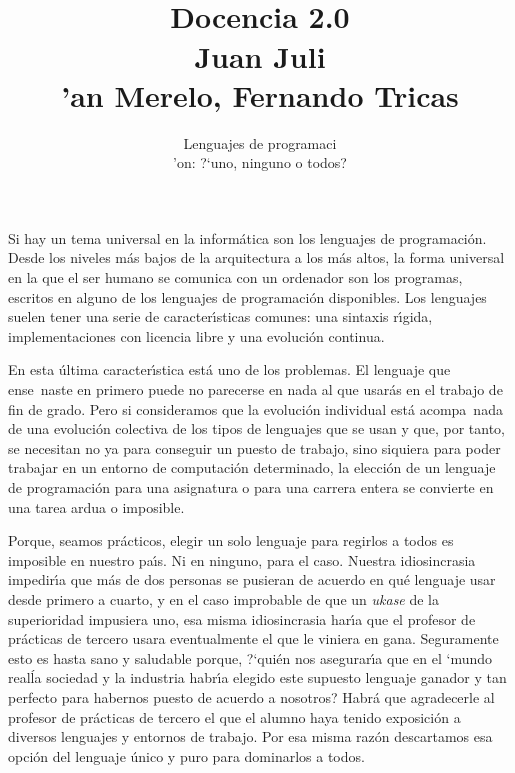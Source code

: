 \documentclass[twoside,10pt]{article}
\title{\ \\ Docencia 2.0\\ \large Juan Juli\\'{a}n Merelo, Fernando Tricas}
\author{\LARGE Lenguajes de programaci\\'on: ?`uno, ninguno o todos?}
\date{}
\newcounter{vol}
\begin{document}
\addtocounter{page}{2}

\maketitle

\vspace*{-5ex}

\begin{multicols}{2}

Si hay un tema universal en la inform\'atica son los lenguajes de
programaci\'on. Desde los niveles m\'as bajos de la arquitectura a los m\'as
altos, la forma universal en la que el ser humano se comunica con un
ordenador son los programas, escritos en alguno de los lenguajes de
programaci\'on disponibles. Los lenguajes suelen tener una serie de
caracter\'{\i}sticas comunes: una sintaxis r\'{\i}gida, implementaciones con
licencia libre y una evoluci\'on continua.

En esta \'ultima caracter\'{\i}stica est\'a uno de los problemas. El lenguaje
que ense~naste en primero puede no parecerse en nada al que usar\'as en
el trabajo de fin de grado. Pero si consideramos que la evoluci\'on
individual est\'a acompa~nada de una evoluci\'on colectiva de los tipos de
lenguajes que se usan y que, por tanto, se necesitan no ya para
conseguir un puesto de trabajo, sino siquiera para poder trabajar en
un entorno de computaci\'on determinado, la elecci\'on de un lenguaje de
programaci\'on para una asignatura o para una carrera entera se convierte en
una tarea ardua o imposible.

Porque, seamos pr\'acticos, elegir un solo lenguaje para regirlos a
todos es imposible en nuestro pa\'{\i}s. Ni en ninguno, para el caso.
Nuestra idiosincrasia impedir\'{\i}a que m\'as de dos personas se pusieran de
acuerdo en qu\'e lenguaje usar desde primero a cuarto, y en el caso
improbable de que un {\em ukase} de la superioridad impusiera uno, esa
misma idiosincrasia har\'{\i}a que el profesor de pr\'acticas de tercero usara
eventualmente el que le viniera en gana. 
Seguramente esto es hasta sano y saludable porque, ?`qui\'en nos asegurar\'{\i}a
que en el `mundo real\' la sociedad y la industria habr\'{\i}a elegido este
supuesto lenguaje ganador y tan perfecto para habernos puesto de acuerdo a
nosotros? Habr\'a que agradecerle al profesor de pr\'acticas de tercero el que
el alumno  haya tenido exposici\'on a diversos lenguajes y
entornos de trabajo. Por esa misma raz\'on descartamos esa opci\'on
del lenguaje \'unico y puro para dominarlos a todos.


\end{multicols}
\end{document}
